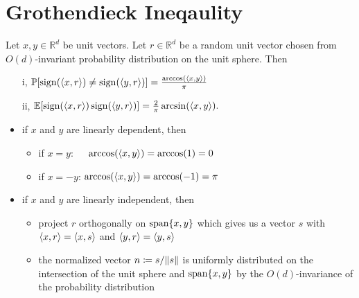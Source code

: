 \section{Grothendieck Ineqaulity}

\begin{frame}
	\begin{lemma}\label{lem:G_id}
		Let $x,y\in\mathbb{R}^d$ be unit vectors. Let $r\in\mathbb{R}^d$ be a random unit vector chosen from $O(d)$-invariant probability distribution on the unit sphere. Then
		\begin{enumerate}
			\item[i,] $\mathbb{P}[\operatorname{sign}(\langle{x},{r}\rangle)\neq\operatorname{sign}(\langle{y},{r}\rangle)]=\frac{\arccos(\langle{x},{y}\rangle)}{\pi}$
			\item[ii,] $\mathbb{E}[\operatorname{sign}(\langle{x},{r}\rangle)\operatorname{sign}(\langle{y},{r}\rangle)]=\frac{2}{\pi}\arcsin(\langle{x},{y}\rangle).$
		\end{enumerate}
	\end{lemma}
	\begin{pbmr}
		\begin{itemize}
			\item<1-> if $x$ and $y$ are linearly dependent, then
				\begin{itemize}
					\item<2-> if $x=y$:~~\, $\arccos(\langle{x},{y}\rangle)=\arccos(1) = 0$
					\item<3-> if $x=-y$: $\arccos(\langle{x},{y}\rangle)=\arccos(-1) = \pi$
				\end{itemize}
			\item<4-> if $x$ and $y$ are linearly independent, then 
				\begin{itemize}
					\item<5-> project $r$ orthogonally on $\operatorname{span}\{x,y\}$ which gives us a vector $s$ with $\langle{x},{r}\rangle = \langle{x},{s}\rangle$ and $\langle{y},{r}\rangle = \langle{y},{s}\rangle$
					\item<6-> the normalized vector $n\coloneqq s/ \Vert {s} \Vert$ is uniformly distributed on the intersection of the unit sphere and $\operatorname{span}\{x,y\}$ by the $O(d)$-invariance of the probability distribution
				\end{itemize}
		\end{itemize}
	\end{pbmr}
\end{frame}